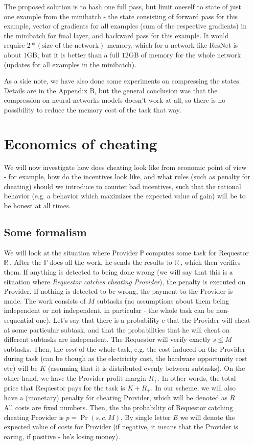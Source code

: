 \documentclass{winnower}
\newcommand{\R}{$\mathbb{R\ }$}
\newcommand{\X}{$\mathbb{P\ }$}
\begin{document}
The proposed solution is to hash one full pass, but limit oneself to state of just one example from the minibatch - the state consisting of forward pass for this example, vector of gradients for all examples (sum of the respective gradients) in the minibatch for final layer, and backward pass for this example. It would require $2*(\text{size of the network})$ memory, which for a network like ResNet\citep{biggpus} is about $1$GB, but it is better than a full $12$GB of memory for the whole network (updates for all examples in the minibatch).

As a side note, we have also done some experiments on compressing the states. Details are in the Appendix B, but the general conclusion was that the compression on neural networks models doesn't work at all, so there is no possibility to reduce the memory cost of the task that way.

\section{Economics of cheating}

We will now investigate how does cheating look like from economic point of view - for example, how do the incentives look like, and what rules (such as penalty for cheating) should we introduce to counter bad incentives, such that the rational behavior (e.g. a behavior which maximizes the expected value of gain) will be to be honest at all times.

\subsection{Some formalism}
We will look at the situation where Provider \X computes some task for Requestor \R. After the \X does all the work, he sends the results to \R, which then verifies them. If anything is detected to being done wrong (we will say that this is a situation where \textit{Requestor catches cheating Provider}), the penalty is executed on Provider. If nothing is detected to be wrong, the payment to the Provider is made.
The work consists of $M$ subtasks (no assumptions about them being independent or not independent, in particular - the whole task can be non-sequential one).
Let's say that there is a probability $c$ that the Provider will cheat at some particular subtask, and that the probabilities that he will cheat on different subtasks are independent. The Requestor will verify exactly $s \leq M $ subtasks.
Then, the \textit{cost} of the whole task, e.g. the cost induced on the Provider during task (can be though as the electricity cost, the hardware opportunity cost etc) will be $K$ (assuming that it is distributed evenly between subtasks). On the other hand, we have the Provider profit margin $R_{+}$. In other words, the total price that Requestor pays for the task is $K + R_{+}$.
In our scheme, we will also have a (monetary) penalty for cheating Provider, which will be denoted as $R_{-}$.
All costs are fixed numbers.
Then, the the probability of Requestor catching cheating Provider is $p = \Pr(s, c, M)$.
By single letter $E$ we will denote the expected value of costs for Provider (if negative, it means that the Provider is earing, if positive - he's losing money).
\end{document}
